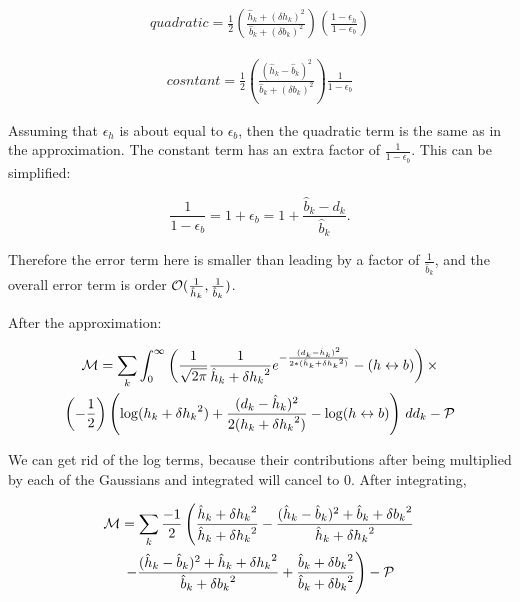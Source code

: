 \documentclass[twocolumn,twoside,prd]{revtex4} %
\newcommand {\expBK}[1]{e^{#1}}
\begin{document}
\begin{multline} 
\label{eqn:Taylor3}
quadratic = \frac {1}{2} \left( \frac {\hat h_k + (\delta h_k)^2} {\hat b_k + (\delta b_k)^2} \right) \left(\frac {1-\epsilon_h}{1-\epsilon_b}  \right)
\end{multline}

\begin{multline} 
\label{eqn:Taylor4}
cosntant = \frac {1}{2} \left( \frac {(\hat h_k - \hat b_k)^2} {\hat b_k + (\delta b_k)^2} \right) \frac {1}{1-\epsilon_b}
\end{multline}

Assuming that $\epsilon_h$ is about equal to $\epsilon_b$, then the quadratic term is the same as in the approximation.  The constant term has an extra factor of $ \frac {1}{1-\epsilon_b}$.  This can be simplified:

\begin{equation} 
\label{eqn:Taylor5}
\frac {1}{1-\epsilon_b} = 1+\epsilon_b = 1 + \frac {\hat b_k - d_k}{\hat b_k}.
\end{equation}

Therefore the error term here is smaller than leading by a factor of $\frac {1}{\hat b_k}$, and the overall error term is order ${\cal O}(\frac{1}{\hat h_k}, \frac{1}{\hat b_k})$. 

After the approximation:   

\begin{multline}
\label{eqn:SimplifyM3}
{\cal M} = \sum_k \int_0^\infty{  \left(\frac{1}{\sqrt{2\pi}}  \frac{1}{{\hat h_k} + {\delta h_k}^2} \expBK{- \frac{( d_k -  \hat h_k )^2} {2*({\hat h_k} + {\delta h_k}^2)}}  - ( h \leftrightarrow b)\right) \times } \\
{ \left(-\frac{1}{2}\right) \left(\log({h_k} + {\delta h_k}^2)  + \frac {( d_k -  \hat h_k )^2}{2({h_k} + {\delta h_k}^2)} - \log ( h \leftrightarrow b  )\right) \, dd_k} - {\cal P}\\
\end{multline}

We can get rid of the log terms, because their contributions after being multiplied by each of the Gaussians and integrated will cancel to 0.  After integrating,

\begin{multline}
\label{eqn:SimplifyM4}
{\cal M} = \sum_k \frac {-1}{2} \left(\frac {\hat h_k + {\delta h_k}^2} {\hat h_k + {\delta h_k}^2} - \frac {(\hat h_k - \hat b_k)^2 + \hat b_k + {\delta b_k}^2 }{\hat h_k + {\delta h_k}^2} \right. \\
\left. - \frac {(\hat h_k - \hat b_k)^2 + \hat h_k + {\delta h_k}^2 }{\hat b_k + {\delta b_k}^2} + \frac {\hat b_k + {\delta b_k}^2}{\hat b_k + {\delta b_k}^2}\right) - {\cal P}\\
\end{multline}
\end{document}
